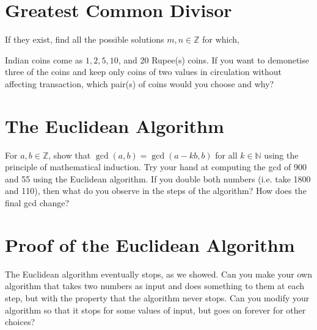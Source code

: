 \documentclass[12pt]{exam}
\begin{document}
\section{Greatest Common Divisor}
\begin{questions}
\question If they exist, find all the possible solutions $m, n \in \mathbb{Z}$ for which,
\question Indian coins come as $1, 2, 5, 10$, and $20$ Rupee(s) coins. If you want to demonetise three of the coins and keep only coins of two values in circulation without affecting transaction, which pair(s) of coins would you choose and why? 
\end{questions}

\section{The Euclidean Algorithm}
\begin{questions}
    \question For $a, b \in \mathbb{Z}$, show that $\gcd(a, b) = \gcd(a - kb, b)$ for all $k \in \mathbb{N}$ using the principle of mathematical induction.
    \question Try your hand at computing the gcd of 900 and 55 using the Euclidean algorithm.
    \question If you double both numbers (i.e. take 1800 and 110), then what do you observe in the steps of the algorithm? How does the final gcd change?
\end{questions}
\section{Proof of the Euclidean Algorithm}
\begin{questions}
    \question The Euclidean algorithm eventually stops, as we showed. Can you make your own algorithm that takes two numbers as input and does something to them at each step, but with the property that the algorithm never stops.
    \question Can you modify your algorithm so that it stops for some values of input, but goes on forever for other choices?
\end{questions}
\end{document}
